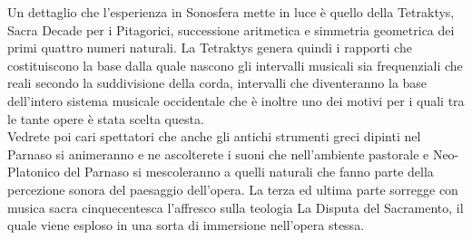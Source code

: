 \documentclass[hidelinks,12pt,a4paper]{article}
\begin{document}
\begin{flushleft}
		Un dettaglio che l'esperienza in Sonosfera mette in luce è quello della Tetraktys, Sacra Decade per i Pitagorici, successione aritmetica e simmetria geometrica dei primi quattro numeri naturali. La Tetraktys genera quindi i rapporti che costituiscono la base dalla quale nascono gli intervalli musicali sia frequenziali che reali secondo la suddivisione della corda, intervalli che diventeranno la base dell'intero sistema musicale occidentale che è inoltre uno dei motivi per i quali tra le tante opere è stata scelta questa.\\
		Vedrete poi cari spettatori che anche gli antichi strumenti greci dipinti nel Parnaso si animeranno e ne ascolterete i suoni che nell'ambiente pastorale e Neo-Platonico del Parnaso si mescoleranno a quelli naturali che fanno parte della percezione sonora del paesaggio dell'opera. La terza ed ultima parte sorregge con musica sacra cinquecentesca l'affresco sulla teologia La Disputa del Sacramento, il quale viene esploso in una sorta di immersione nell'opera stessa.
		
		\vspace*{\fill}
		\doclicenseThis
	\end{flushleft}
\end{document}
